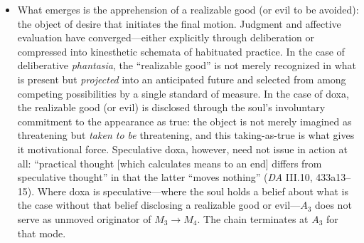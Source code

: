 \begin{itemize}
\begin{itemize}
          \item What emerges is the apprehension of a realizable good (or evil to
          be avoided): the object of desire that initiates the final motion.
          Judgment and affective evaluation have converged---either explicitly
          through deliberation or compressed into kinesthetic schemata of
          habituated practice. In the case of deliberative \textit{phantasia}, the
          ``realizable good'' is not merely recognized in what is present but
          \textit{projected} into an anticipated future and selected from among
          competing possibilities by a single standard of measure. In the case of
          doxa, the realizable good (or evil) is disclosed through the soul's
          involuntary commitment to the appearance as true: the object is not
          merely imagined as threatening but \textit{taken to be} threatening, and
          this taking-as-true is what gives it motivational force. Speculative doxa,
          however, need not issue in action at all: ``practical thought [which
          calculates means to an end] differs from speculative thought'' in that the
          latter ``moves nothing'' (\textit{DA} III.10, 433a13--15). Where doxa is
          speculative---where the soul holds a belief about what is the case without
          that belief disclosing a realizable good or evil---$A_3$ does not serve as
          unmoved originator of $M_3 \rightarrow M_4$. The chain terminates at $A_3$
          for that mode.


\end{itemize}
\end{itemize}
